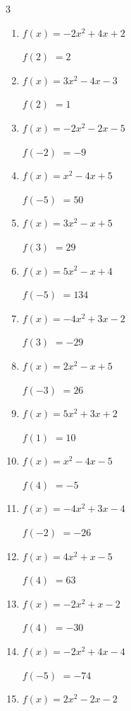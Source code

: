 \begin{multicols}{3}
\begin{enumerate}
$f(1)$
        $= 0$

\columnbreak %

  \item $f(x)=-2x^{2}+4x+2$

$f(2)$
        $= 2$

  \item $f(x)=3x^{2}-4x-3$

$f(2)$
        $= 1$

  \item $f(x)=-2x^{2}-2x-5$

$f(-2)$
        $= -9$

  \item $f(x)=x^{2}-4x+5$

$f(-5)$
        $= 50$

  \item $f(x)=3x^{2}-x+5$

$f(3)$
        $= 29$

  \item $f(x)=5x^{2}-x+4$

$f(-5)$
        $= 134$

  \item $f(x)=-4x^{2}+3x-2$

$f(3)$
        $= -29$

  \item $f(x)=2x^{2}-x+5$

$f(-3)$
        $= 26$

  \item $f(x)=5x^{2}+3x+2$

$f(1)$
        $= 10$

  \item $f(x)=x^{2}-4x-5$

$f(4)$
        $= -5$

  \item $f(x)=-4x^{2}+3x-4$

$f(-2)$
        $= -26$

  \item $f(x)=4x^{2}+x-5$

$f(4)$
        $= 63$

  \item $f(x)=-2x^{2}+x-2$

$f(4)$
        $= -30$

  \item $f(x)=-2x^{2}+4x-4$

$f(-5)$
        $= -74$

  \item $f(x)=2x^{2}-2x-2$


\end{enumerate}
\end{multicols}
